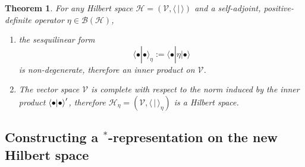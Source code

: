 \documentclass[amsmath,amssymb,aps,pra,superscriptaddress,twocolumn]{revtex4-2}
\newtheorem{theorem}{Theorem}
\begin{document}
\begin{appendix}
\begin{theorem}
For any Hilbert space $\mathscr{H} = \left(\mathscr{V},\langle\,\vert\,\rangle\right)$ 
and a self-adjoint, positive-definite operator $\eta \in \mathcal{B}(\mathscr{H})$, 
\begin{enumerate}
    \item the sesquilinear form 
    \begin{equation}
    \label{eq:newip}
        \langle\bullet|\bullet \rangle_\eta := \langle\bullet|\eta|\bullet\rangle
    \end{equation}
    is non-degenerate, therefore an inner product on $\mathscr{V}$.
    \item The vector space $\mathscr{V}$ is complete with respect to the norm induced by the inner product 
    $\braket{\bullet|\bullet}'$, therefore $\mathscr{H}_\eta = \left(\mathscr{V},\langle\,\vert\,\rangle_\eta\right)$  is a Hilbert space.
\end{enumerate}
\end{theorem}

\subsection{Constructing a \texorpdfstring{${}^{*}$}{*}-representation on the new Hilbert space}


\end{appendix}
\end{document}
